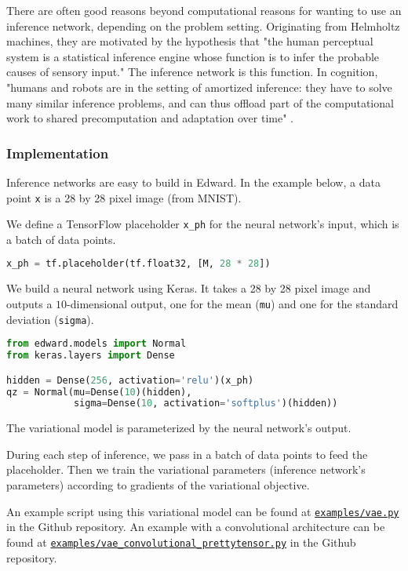 There are often good reasons beyond computational reasons
for wanting to use an inference network, depending on the problem
setting.
Originating from
Helmholtz machines, they are motivated by the hypothesis
that "the human perceptual system is a statistical inference engine
whose function is to infer the probable causes of sensory input." The
inference network is this function.
In cognition, "humans and robots are in the setting of amortized
inference: they have to solve many similar inference problems, and can
thus offload part of the computational work to shared precomputation
and adaptation over time" \citep{stuhlmuller2013learning}.

\subsubsection{Implementation}

Inference networks are easy to build in Edward.
In the example below, a data point \texttt{x} is a 28 by 28 pixel
image (from MNIST).

We define a TensorFlow placeholder \texttt{x_ph} for the neural
network's input, which is a batch of data points.
\begin{lstlisting}[language=Python]
x_ph = tf.placeholder(tf.float32, [M, 28 * 28])
\end{lstlisting}

We build a neural network using Keras.
It takes a 28 by 28 pixel image and outputs a $10$-dimensional
output, one for the mean (\texttt{mu}) and one for the standard
deviation (\texttt{sigma}).
\begin{lstlisting}[language=Python]
from edward.models import Normal
from keras.layers import Dense

hidden = Dense(256, activation='relu')(x_ph)
qz = Normal(mu=Dense(10)(hidden),
            sigma=Dense(10, activation='softplus')(hidden))
\end{lstlisting}
The variational model is parameterized by the neural network's
output.

During each step of inference, we pass in a batch of data points to feed the
placeholder. Then we train the variational parameters (inference
network's parameters) according to
gradients of the variational objective.

An example script using this variational model can be found at
\href{https://github.com/blei-lab/edward/blob/master/examples/vae.py}
{\texttt{examples/vae.py}} in the Github repository.
An example with a convolutional architecture can be found at
\href{https://github.com/blei-lab/edward/blob/master/examples/vae_convolutional_prettytensor.py}
{\texttt{examples/vae_convolutional_prettytensor.py}} in the Github repository.

